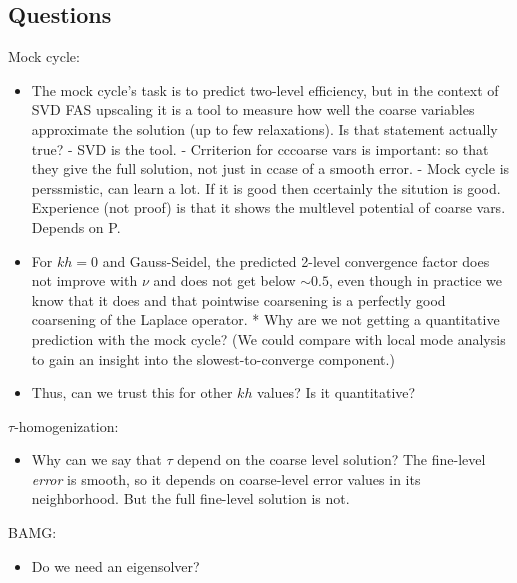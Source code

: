\documentclass{article}
\begin{document}
\subsection{Questions}
Mock cycle:
\begin{itemize}

\item The mock cycle's task is to predict two-level efficiency, but in the context of SVD FAS upscaling it is a tool to measure how well the coarse variables approximate the solution (up to few relaxations). Is that statement actually true? 
- SVD is the tool.
- Crriterion for cccoarse vars is important: so that they give the full solution, not just in ccase of a smooth error.
- Mock cycle is perssmistic, can learn a lot. If it is good then ccertainly the sitution is good. Experience (not proof) is that it shows the multlevel potential of coarse vars. Depends on P.

\item For $kh = 0$ and Gauss-Seidel, the predicted 2-level convergence factor does not improve with $\nu$ and does not get below $\sim 0.5$, even though in practice we know that it does and that pointwise coarsening is a perfectly good coarsening of the Laplace operator.
* Why are we not getting a quantitative prediction with the mock cycle? (We could compare with local mode analysis to gain an insight into the slowest-to-converge component.)
\item Thus, can we trust this for other $kh$ values? Is it quantitative?
\end{itemize}
$\tau$-homogenization:
\begin{itemize}
	\item Why can we say that $\tau$ depend on the coarse level solution? The fine-level \emph{error} is smooth, so it depends on coarse-level error values in its neighborhood. But the full fine-level solution is not.
\end{itemize}
BAMG:
\begin{itemize}
	\item Do we need an eigensolver?
\end{itemize}



\end{document}
